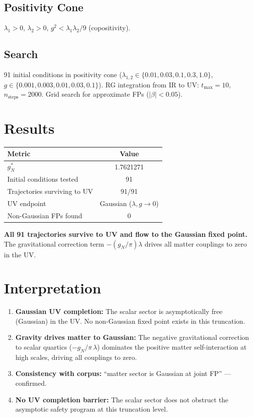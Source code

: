 \documentclass[11pt]{article}
\begin{document}
\subsection{Positivity Cone}
$\lambda_1 > 0$, $\lambda_2 > 0$, $g^2 < \lambda_1\lambda_2/9$ (copositivity).

\subsection{Search}
91 initial conditions in positivity cone ($\lambda_{1,2} \in \{0.01, 0.03, 0.1, 0.3, 1.0\}$, $g \in \{0.001, 0.003, 0.01, 0.03, 0.1\}$). RG integration from IR to UV: $t_{\max}=10$, $n_{\text{steps}}=2000$. Grid search for approximate FPs ($|\beta| < 0.05$).

\section{Results}
\begin{table}[ht]
\centering
\begin{tabular}{lc}
\toprule
Metric & Value \\
\midrule
$g_N^*$ & 1.7621271 \\
Initial conditions tested & 91 \\
Trajectories surviving to UV & 91/91 \\
UV endpoint & Gaussian ($\lambda,g\to 0$) \\
Non-Gaussian FPs found & 0 \\
\bottomrule
\end{tabular}
\end{table}
\textbf{All 91 trajectories survive to UV and flow to the Gaussian fixed point.} The gravitational correction term $-(g_N/\pi)\lambda$ drives all matter couplings to zero in the UV.

\section{Interpretation}
\begin{enumerate}
\item \textbf{Gaussian UV completion:} The scalar sector is asymptotically free (Gaussian) in the UV. No non-Gaussian fixed point exists in this truncation.
\item \textbf{Gravity drives matter to Gaussian:} The negative gravitational correction to scalar quartics ($-g_N/\pi\,\lambda$) dominates the positive matter self-interaction at high scales, driving all couplings to zero.
\item \textbf{Consistency with corpus:} ``matter sector is Gaussian at joint FP'' --- confirmed.
\item \textbf{No UV completion barrier:} The scalar sector does not obstruct the asymptotic safety program at this truncation level.
\end{enumerate}
\end{document}
